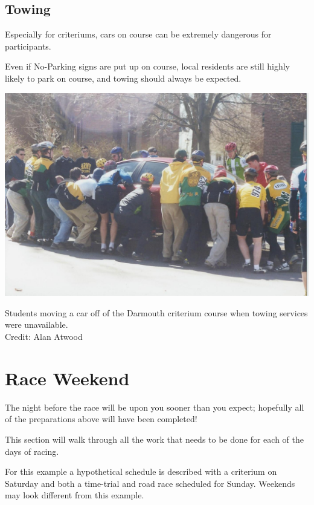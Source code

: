 \documentclass[
  letterpaper, %
  fontsize=10pt, %
  twoside=true,
  chapterentrydots=true, %
  numbers=noenddot,
  fontmethod=tex,
]{kaobook}
\begin{document}
\subsection{Towing}

Especially for criteriums, %
cars on course can be extremely dangerous for participants.

Even if No-Parking signs %
are put up on course, local residents are still highly likely to park on course,
and towing should always be expected.

\begin{marginfigure}
\includegraphics{dartmouth_car.jpg}
\caption[Students moving a car off a criterium course]{
          Students moving a car off of the Darmouth criterium course
          when towing services were unavailable.\\
          Credit: Alan Atwood}
\end{marginfigure}


\section{Race Weekend}

The night before the race will be upon you sooner than you expect;
hopefully all of the preparations above will have been completed!

This section will walk through all the work that needs to be done for each of the days of racing.

For this example a hypothetical schedule is described with a criterium on Saturday and both a time-trial and road race scheduled for Sunday.
Weekends may look different from this example.
\end{document}
